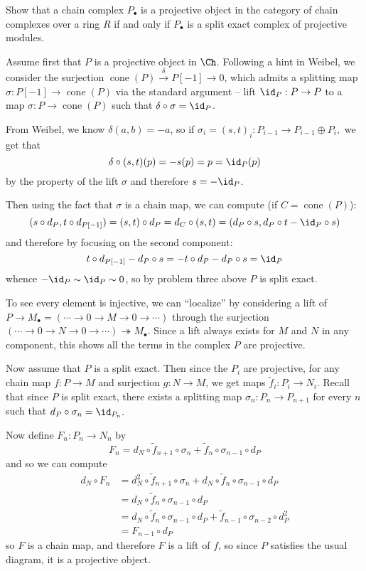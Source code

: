 \documentclass[12pt]{article}
\begin{document}
\begin{prob}
	Show that a chain complex $P_\bullet$ is a projective object in the category of
chain complexes over a ring $R$ if and only if $P_\bullet$ is a split exact complex of projective
modules.
\end{prob}
\begin{sol}
	Assume first that $P$ is a projective object in $\Ch$. Following a hint in Weibel, we consider the surjection
	$\operatorname{cone}(P)\xrightarrow{\delta} P[-1]\to 0$, which admits a splitting map $\sigma:P[-1]\to\operatorname{cone}(P)$
	via the standard argument -- lift $\id_P:P\to P$ to a map $\sigma:P\to \operatorname{cone}(P)$ such that
	$\delta\circ\sigma=\id_P$.

	From Weibel, we know $\delta(a,b)=-a$, so if $\sigma_i=(s,t)_i:P_{i-1}\to P_{i-1}\oplus P_i,$ we get that
	\[\delta\circ(s,t)(p)=-s(p)=p=\id_P(p)\]
	by the property of the lift $\sigma$ and therefore $s=-\id_P$.

	Then using the fact that $\sigma$ is a chain map, we can compute (if $C=\operatorname{cone}(P)$):
	\[
		(s\circ d_P,t\circ d_{P[-1]})=(s,t)\circ d_P=d_C\circ(s,t)=(d_P\circ s, d_P\circ t-\id_P\circ s)
	\]
	and therefore by focusing on the second component:
	\[t\circ d_{P[-1]}-d_P\circ s=-t\circ d_P-d_P\circ s=\id_P\]
	whence $-\id_P\sim\id_P\sim 0$, so by problem three above $P$ is split exact.

	To see every element is injective, we can ``localize'' by considering a lift of $P\to M_\bullet=(\cdots\to0\to M\to 0\to \cdots)$
	through the surjection $(\cdots\to 0\to N\to 0\to\cdots)\twoheadrightarrow M_\bullet$. Since a lift always exists for $M$ and $N$ 
	in any component, this shows all the terms in the complex $P$ are projective.

	\brk

	Now assume that $P$ is a split exact. Then since the $P_i$ are projective, for any chain map $f:P\to M$ and 
	surjection $g:N\to M$, we get maps $\tilde f_i:P_i\to N_i$. Recall that since $P$ is split exact, there 
	exists a splitting map $\sigma_n:P_n\to P_{n+1}$ for every $n$ such that $d_P\circ \sigma_n=\id_{P_n}.$

	Now define $F_n:P_n\to N_n$ by 
	\[F_n=d_N\circ \tilde f_{n+1}\circ \sigma_n+\tilde f_n\circ\sigma_{n-1}\circ d_P\]
	and so we can compute
	\begin{align*}
		d_N\circ F_n&=d_N^2\circ\tilde f_{n+1}\circ \sigma_n + d_N\circ\tilde f_n\circ \sigma_{n-1}\circ d_P\\
		&= d_N\circ\tilde f_n\circ \sigma_{n-1}\circ d_P\\
		&= d_N\circ\tilde f_n\circ \sigma_{n-1}\circ d_P + \tilde f_{n-1}\circ\sigma_{n-2}\circ d_P^2\\
		&= F_{n-1}\circ d_P
	\end{align*}
	so $F$ is a chain map, and therefore $F$ is a lift of $f$, so since $P$ satisfies the usual 
	diagram, it is a projective object.
\end{sol}
\end{document}

